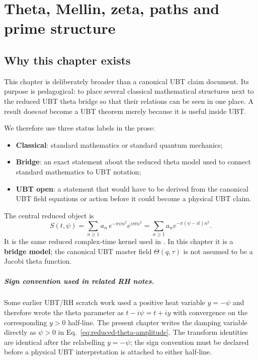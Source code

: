 
\chapter{Theta, Mellin, zeta, paths and prime structure}
\label{ch:theta-mellin-feynman}

\section{Why this chapter exists}

This chapter is deliberately broader than a canonical UBT claim document.  Its purpose is
pedagogical: to place several classical mathematical structures next to the reduced UBT
theta bridge so that their relations can be seen in one place.  A result does\emph{not}
become a UBT theorem merely because it is useful inside UBT.

We therefore use three status labels in the prose:
\begin{itemize}
  \item\textbf{Classical}: standard mathematics or standard quantum mechanics;
  \item\textbf{Bridge}: an exact statement about the reduced theta model used to connect
        standard mathematics to UBT notation;
  \item\textbf{UBT open}: a statement that would have to be derived from the canonical
        UBT field equations or action before it could become a physical UBT claim.
\end{itemize}

The central reduced object is
\begin{equation}
  S(t,\psi)
  = \sum_{n\ge 1} a_n\,e^{-\pi\psi n^2}e^{i\pi t n^2}
  = \sum_{n\ge1}a_n e^{-\pi(\psi-it)n^2}.
  \label{eq:reduced-theta-amplitude}
\end{equation}
It is the same reduced complex-time kernel used in
.  In this chapter it is a
\textbf{bridge model}; the canonical UBT master field $\Theta(q,\tau)$ is not assumed to
be a Jacobi theta function.

\paragraph{Sign convention used in related RH notes.}
Some earlier UBT/RH scratch work used a positive heat variable $y=-\psi$ and therefore
wrote the theta parameter as $t-i\psi=t+iy$ with convergence on the corresponding
$y>0$ half-line.  The present chapter writes the damping variable directly as $\psi>0$
in Eq.~\eqref{eq:reduced-theta-amplitude}.  The transform identities are identical after
the relabelling $y=-\psi$; the sign convention must be declared before a physical UBT
interpretation is attached to either half-line.

